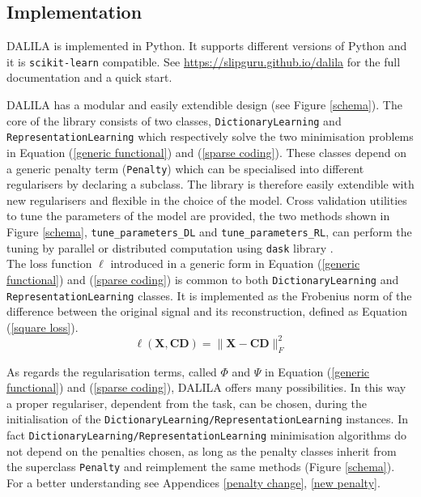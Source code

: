 \subsection{Implementation}
DALILA is implemented in Python. It supports different versions of Python and it is \texttt{scikit-learn} compatible. See \url{https://slipguru.github.io/dalila} for the full documentation and a quick start.

DALILA has a modular and easily extendible design (see Figure \ref{schema}). The core of the library consists of two classes,  \texttt{DictionaryLearning} and \texttt{RepresentationLearning} which respectively solve the two minimisation problems in Equation (\ref{generic functional}) and (\ref{sparse coding}). These classes depend on a generic penalty term (\texttt{Penalty}) which can be specialised into different regularisers by declaring a subclass. The library is therefore easily extendible with new regularisers and flexible in the choice of the model.
Cross validation utilities to tune the parameters of the model are provided, the two methods shown in Figure \ref{schema}, \texttt{tune\_parameters\_DL} and \texttt{tune\_parameters\_RL}, can perform the tuning by parallel or distributed computation using \texttt{dask} library \cite{dask}.\\


The loss function $\ell$ introduced in a generic form in Equation (\ref{generic functional}) and (\ref{sparse coding}) is common to both \texttt{DictionaryLearning} and \texttt{RepresentationLearning} classes.
It is implemented as the Frobenius norm of the difference between the original signal and its reconstruction, defined as Equation (\ref{square loss}).
\begin{equation}\label{square loss}
\ell(\textbf{X}, \textbf{CD}) = \|\textbf{X} - \textbf{CD}\|_F^2
\end{equation}

As regards the regularisation terms, called $\Phi$ and $\Psi$ in Equation (\ref{generic functional}) and (\ref{sparse coding}),  DALILA
offers many possibilities.
In this way a proper regulariser, dependent from the task, can be chosen, during the initialisation of the \texttt{DictionaryLearning/RepresentationLearning} instances.
In fact \texttt{DictionaryLearning/RepresentationLearning} minimisation algorithms do not depend on the penalties chosen,
as long as the penalty classes inherit from the superclass \texttt{Penalty} and reimplement the same methods (Figure \ref{schema}).
For a better understanding see Appendices \ref{penalty change}, \ref{new penalty}.



